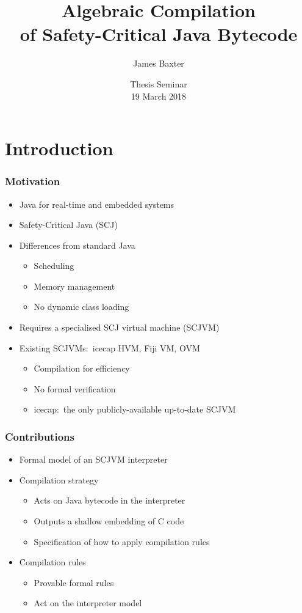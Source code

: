 \documentclass{beamer}
\title{Algebraic Compilation\\of Safety-Critical Java Bytecode}
\author{James Baxter}
\date{Thesis Seminar\\19 March 2018}
\begin{document}
\frame{\titlepage}

\section{Introduction}

\begin{frame}
  \frametitle{Motivation}
  \begin{itemize}
  \item Java for real-time and embedded systems
  \item Safety-Critical Java (SCJ)
  \item Differences from standard Java
    \begin{itemize}
    \item Scheduling
    \item Memory management
    \item No dynamic class loading
    \end{itemize}
  \item Requires a specialised SCJ virtual machine (SCJVM)
  \item Existing SCJVMs:~icecap HVM, Fiji VM, OVM
    \begin{itemize}
    \item Compilation for efficiency
    \item No formal verification
    \item icecap:~the only publicly-available up-to-date SCJVM
    \end{itemize}
  \end{itemize}
\end{frame}

\begin{frame}
  \frametitle{Contributions}
  \begin{itemize}
  \item Formal model of an SCJVM interpreter
  \item Compilation strategy
    \begin{itemize}
    \item Acts on Java bytecode in the interpreter
    \item Outputs a shallow embedding of C code
    \item Specification of how to apply compilation rules
    \end{itemize}
  \item Compilation rules
    \begin{itemize}
    \item Provable formal rules
    \item Act on the interpreter model
    \end{itemize}
  \end{itemize}
\end{frame}
\end{document}
